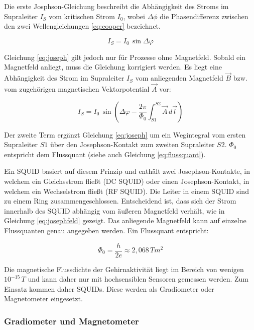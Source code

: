 \documentclass[doc,a4paper,12pt]{apa6}
\begin{document}
Die erste Josphson-Gleichung beschreibt die Abhängigkeit des Stroms im Supraleiter $I_S$ vom kritischen Strom $I_0$, wobei $\Delta \phi$ die Phasendifferenz zwischen den zwei Wellengleichungen \ref{eq:cooper} bezeichnet.

\begin{equation}
\label{eq:joseph}
I_S = I_0\,\sin{\Delta \varphi}
\end{equation}

Gleichung \ref{eq:joseph} gilt jedoch nur für Prozesse ohne Magnetfeld. Sobald ein Magnetfeld anliegt, muss die Gleichung korrigiert werden. Es liegt eine Abhängigkeit des Strom im Supraleiter $I_S$ vom anliegenden Magnetfeld $\vec{B}$ bzw. vom zugehörigen magnetischen Vektorpotential $\vec{A}$ vor:

\begin{equation}
\label{eq:josephfeld}
I_S = I_0\,\sin{\left( \Delta \varphi - \frac{2\pi}{\Phi_0} \int_{S1}^{S2} \vec{A}\,d\vec{l} \right)}
\end{equation}

Der zweite Term ergänzt Gleichung \ref{eq:joseph} um ein Wegintegral vom ersten Supraleiter $S1$ über den Josephson-Kontakt zum zweiten Supraleiter $S2$. $\Phi_0$ entspricht dem Flussquant (siehe auch Gleichung \ref{eq:flussquant}).

Ein SQUID basiert auf diesem Prinzip und enthält zwei Josephson-Kontakte, in welchem ein Gleichsstrom fließt (DC SQUID) oder einen Josephson-Kontakt, in welchem ein Wechselstrom fließt (RF SQUID). Die Leiter in einem SQUID sind zu einem Ring zusammengeschlossen. Entscheidend ist, dass sich der Strom innerhalb des SQUID abhängig vom äußeren Magnetfeld verhält, wie in Gleichung \ref{eq:josephfeld} gezeigt. Das anliegende Magnetfeld kann auf einzelne Flussquanten genau angegeben werden. Ein Flussquant entspricht:

\begin{equation}
\label{eq:flussquant}
\Phi_0 = \frac{h}{2e} \approx 2,068\,Tm^2
\end{equation}

Die magnetische Flussdichte der Gehirnaktivität liegt im Bereich von wenigen $10^{-15}\,T$ und kann daher nur mit hochsensiblen Sensoren gemessen werden. Zum Einsatz kommen daher SQUIDs. Diese werden als Gradiometer oder Magnetometer eingesetzt.

\subsubsection{Gradiometer und Magnetometer}
\end{document}
